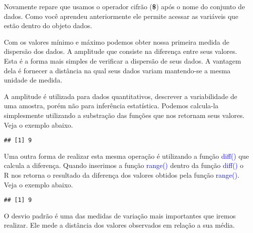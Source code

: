 \documentclass[14pt,titlepage, oneside, openany, a4paper]{book}
\newenvironment{Shaded}{\begin{snugshade}}{\end{snugshade}}
\newcommand{\KeywordTok}[1]{\textcolor[rgb]{0.13,0.29,0.53}{\textbf{#1}}}
\newcommand{\NormalTok}[1]{#1}
\newcommand{\OperatorTok}[1]{\textcolor[rgb]{0.81,0.36,0.00}{\textbf{#1}}}
\newcommand{\StringTok}[1]{\textcolor[rgb]{0.31,0.60,0.02}{#1}}
\begin{document}
Novamente repare que usamos o operador cifrão (\textbf{\$}) após o nome do conjunto de dados. Como você aprendeu anteriormente ele permite acessar as variáveis que estão dentro do objeto dados.

Com os valores mínimo e máximo podemos obter nossa primeira medida de dispersão dos dados. A amplitude que consiste na diferença entre seus valores. Esta é a forma mais simples de verificar a dispersão de seus dados. A vantagem dela é fornecer a distância na qual seus dados variam mantendo-se a mesma unidade de medida.

A amplitude é utilizada para dados quantitativos, descrever a variabilidade de uma amostra, porém não para inferência estatística. Podemos calcula-la simplesmente utilizando a substração das funções que nos retornam seus valores. Veja o exemplo abaixo.

\begin{Shaded}
\end{Shaded}

\begin{verbatim}
## [1] 9
\end{verbatim}

Uma outra forma de realizar esta mesma operação é utilizando a função \textcolor{blue}{diff()} que calcula a diferença. Quando inserimos a função \textcolor{blue}{range()} dentro da função \textcolor{blue}{diff()} o R nos retorna o resultado da diferença dos valores obtidos pela função \textcolor{blue}{range()}. Veja o exemplo abaixo.

\begin{Shaded}
\end{Shaded}

\begin{verbatim}
## [1] 9
\end{verbatim}

O desvio padrão é uma das medidas de variação mais importantes que iremos realizar. Ele mede a distância dos valores observados em relação a sua média.
\end{document}
